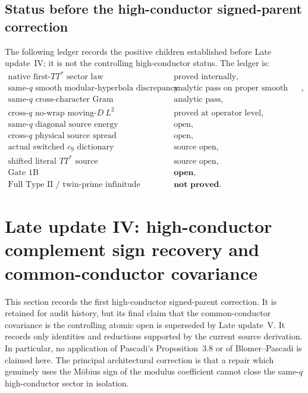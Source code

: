 \documentclass[11pt]{article}
\theoremstyle{definition}
\newcommand{\1}{\mathbf 1}
\begin{document}
\subsection{Status before the high-conductor signed-parent correction}

The following ledger records the positive children established before Late update~IV; it is not the controlling high-conductor status.  The ledger is:
\[
\begin{array}{ll}
\text{native first-}TT^\ast\text{ sector law}
 & \text{proved internally},\\
\text{same-}q\text{ smooth modular-hyperbola discrepancy}
 & \text{analytic pass on proper smooth sector},\\
\text{same-}q\text{ cross-character Gram}
 & \text{analytic pass},\\
\text{cross-}q\text{ no-wrap moving-}D\ L^2
 & \text{proved at operator level},\\
\text{same-}q\text{ diagonal source energy}
 & \text{open},\\
\text{cross-}q\text{ physical source spread}
 & \text{open},\\
\text{actual switched }c_9\text{ dictionary}
 & \text{source open},\\
\text{shifted literal }TT^\ast\text{ source}
 & \text{source open},\\
\text{Gate 1B}
 & \textbf{open},\\
\text{Full Type II / twin-prime infinitude}
 & \textbf{not proved}.
\end{array}
\]




\section{Late update IV: high-conductor complement sign recovery and common-conductor covariance}
\label{app:hicond-common-conductor}

This section records the first high-conductor signed-parent correction.
It is retained for audit history, but its final claim that the common-conductor
covariance is the controlling atomic open is superseded by Late update~V.
It records only identities and reductions supported by the current source
derivation.  In particular, no application of Pascadi's Proposition~3.8 or of
Blomer--Pascadi is claimed here.  The principal architectural correction is
that a repair which genuinely uses the M\"obius sign of the modulus coefficient
cannot close the same-$q$ high-conductor sector in isolation.
\end{document}
